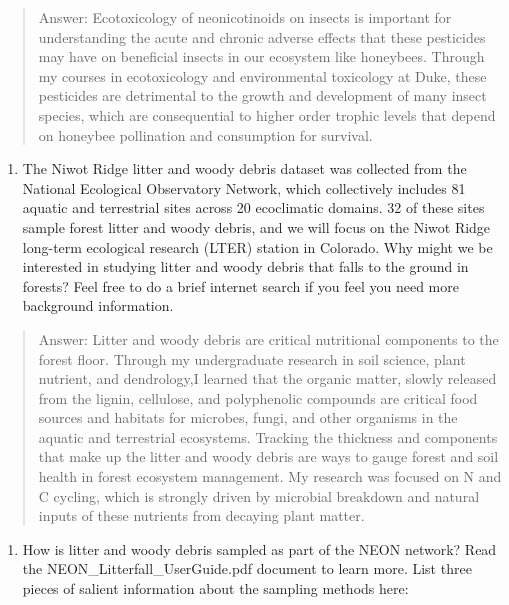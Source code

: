 \documentclass[
]{article}
\providecommand{\tightlist}{%
  \setlength{\itemsep}{0pt}\setlength{\parskip}{0pt}}
\begin{document}
\begin{quote}
Answer: Ecotoxicology of neonicotinoids on insects is important for
understanding the acute and chronic adverse effects that these
pesticides may have on beneficial insects in our ecosystem like
honeybees. Through my courses in ecotoxicology and environmental
toxicology at Duke, these pesticides are detrimental to the growth and
development of many insect species, which are consequential to higher
order trophic levels that depend on honeybee pollination and consumption
for survival.
\end{quote}

\begin{enumerate}
\def\labelenumi{\arabic{enumi}.}
\setcounter{enumi}{2}
\tightlist
\item
  The Niwot Ridge litter and woody debris dataset was collected from the
  National Ecological Observatory Network, which collectively includes
  81 aquatic and terrestrial sites across 20 ecoclimatic domains. 32 of
  these sites sample forest litter and woody debris, and we will focus
  on the Niwot Ridge long-term ecological research (LTER) station in
  Colorado. Why might we be interested in studying litter and woody
  debris that falls to the ground in forests? Feel free to do a brief
  internet search if you feel you need more background information.
\end{enumerate}

\begin{quote}
Answer: Litter and woody debris are critical nutritional components to
the forest floor. Through my undergraduate research in soil science,
plant nutrient, and dendrology,I learned that the organic matter, slowly
released from the lignin, cellulose, and polyphenolic compounds are
critical food sources and habitats for microbes, fungi, and other
organisms in the aquatic and terrestrial ecosystems. Tracking the
thickness and components that make up the litter and woody debris are
ways to gauge forest and soil health in forest ecosystem management. My
research was focused on N and C cycling, which is strongly driven by
microbial breakdown and natural inputs of these nutrients from decaying
plant matter.
\end{quote}

\begin{enumerate}
\def\labelenumi{\arabic{enumi}.}
\setcounter{enumi}{3}
\tightlist
\item
  How is litter and woody debris sampled as part of the NEON network?
  Read the NEON\_Litterfall\_UserGuide.pdf document to learn more. List
  three pieces of salient information about the sampling methods here:
\end{enumerate}
\end{document}
